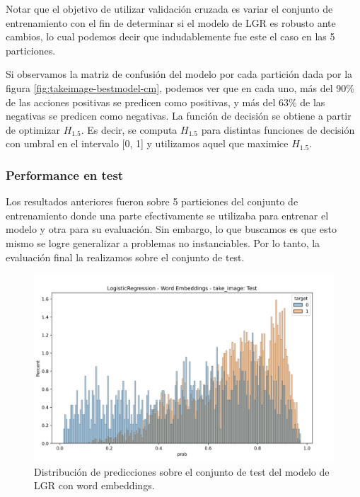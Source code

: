 Notar que el objetivo de utilizar validación cruzada es variar el conjunto de
entrenamiento con el fin de determinar si el modelo de LGR es robusto ante
cambios, lo cual podemos decir que indudablemente fue este el caso en las 5
particiones.

Si observamos la matriz de confusión del modelo por cada partición dada por la
figura \ref{fig:takeimage-bestmodel-cm}, podemos ver que en cada uno, más del
90\% de las acciones positivas se predicen como positivas, y más del 63\% de las
negativas se predicen como negativas. La función de decisión se obtiene a partir
de optimizar $H_{1.5}$. Es decir, se computa $H_{1.5}$ para distintas funciones
de decisión con umbral en el intervalo [0, 1] y utilizamos aquel que maximice
$H_{1.5}$. 

\subsubsection{Performance en test}

Los resultados anteriores fueron sobre 5 particiones del conjunto de
entrenamiento donde una parte efectivamente se utilizaba para entrenar el modelo
y otra para su evaluación. Sin embargo, lo que buscamos es que esto mismo se
logre generalizar a problemas no instanciables. Por lo tanto, la evaluación
final la realizamos sobre el conjunto de test.

\begin{figure}[t!]
    \centering
    \includegraphics[width=0.7\linewidth]{figures/results/word_embeddings/lgr/take_image/lgr_wb_take_image_test.png}
    \caption{Distribución de predicciones sobre el conjunto de test del modelo de LGR con word embeddings.}
    \label{fig:takeimage-bestmodel-distplot-test}
\end{figure}

